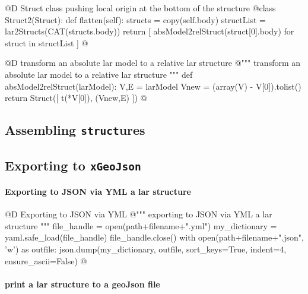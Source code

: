\documentclass[11pt,oneside]{article}	%
\begin{document}
@D Struct class pushing local origin at the bottom of the structure
@{class Struct2(Struct):
	def flatten(self): 
		structs = copy(self.body)
		structList = lar2Structs(CAT(structs.body))
		return [ absModel2relStruct(struct[0].body) for struct in structList ]
@}


@D transform an absolute lar model to a relative lar structure
@{""" transform an absolute lar model to a relative lar structure """
def absModel2relStruct(larModel):
   V,E = larModel
   Vnew = (array(V) - V[0]).tolist()
   return Struct([ t(*V[0]), (Vnew,E) ])
@}



\subsection{Assembling \texttt{struct}ures}

\subsection{Exporting to \texttt{xGeoJson}}


\paragraph{Exporting to JSON via YML a lar structure}

@D Exporting to JSON via YML
@{""" exporting to JSON via YML a lar structure """
file_handle = open(path+filename+".yml")
my_dictionary = yaml.safe_load(file_handle)
file_handle.close()
with open(path+filename+".json", 'w') as outfile:
     json.dump(my_dictionary, outfile, sort_keys=True, indent=4, ensure_ascii=False)
@}


\paragraph{print a lar structure to a geoJson file}
\end{document}
